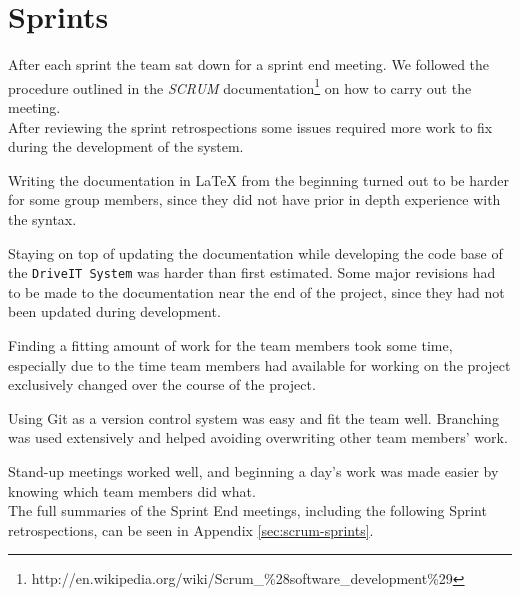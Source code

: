 \section{Sprints}
After each sprint the team sat down for a sprint end meeting. We followed the procedure outlined in the \textit{SCRUM} documentation\footnote{http://en.wikipedia.org/wiki/Scrum\_\%28software\_development\%29} on how to carry out the meeting.\\

After reviewing the sprint retrospections some issues required more work to fix during the development of the system.

Writing the documentation in LaTeX from the beginning turned out to be harder for some group members, since they did not have prior in depth experience with the syntax. 

Staying on top of updating the documentation while developing the code base of the \texttt{DriveIT System} was harder than first estimated. Some major revisions had to be made to the documentation near the end of the project, since they had not been updated during development.

Finding a fitting amount of work for the team members took some time, especially due to the time team members had available for working on the project exclusively changed over the course of the project.

Using Git as a version control system was easy and fit the team well. Branching was used extensively and helped avoiding overwriting other team members' work. 

Stand-up meetings worked well, and beginning a day's work was made easier by knowing which team members did what. \\

The full summaries of the Sprint End meetings, including the following Sprint retrospections, can be seen in Appendix \ref{sec:scrum-sprints}.
